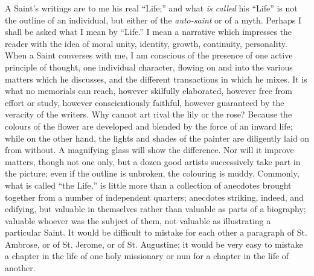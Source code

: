 A Saint's writings are to me his real ``Life;'' and what \emph{is
called} his ``Life'' is not the outline of an individual,
but either of the \emph{auto-saint} or of a myth. Perhaps I shall be
asked what I mean by ``Life.'' I mean a narrative which
impresses the reader with the idea of moral unity, identity, growth,
continuity, personality. When a Saint converses with me, I am
conscious of the presence of one active principle of thought, one
individual character, flowing on and into the various matters which he
discusses, and the different transactions in which he mixes. It is
what no memorials can reach, however skilfully elaborated, however
free from effort or study, however conscientiously faithful, however
guaranteed by the veracity of the writers. Why cannot art rival the
lily or the rose? Because the colours of the flower are developed and
blended by the force of an inward life; while on the other hand, the
lights and shades of the painter are diligently laid on from without.
A magnifying glass will show the difference. Nor will it improve matters, though not one only, but a dozen good artists successively
take part in the picture; even if the outline is unbroken, the
colouring is muddy. Commonly, what is called ``the Life,'' is
little more than a collection of anecdotes brought together from a
number of independent quarters; anecdotes striking, indeed, and
edifying, but valuable in themselves rather than valuable as parts of
a biography; valuable whoever was the subject of them, not valuable as
illustrating a particular Saint. It would be difficult to mistake for
each other a paragraph of St. Ambrose, or of St. Jerome, or of St.
Augustine; it would be very easy to mistake a chapter in the life of
one holy missionary or nun for a chapter in the life of another.

